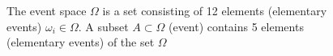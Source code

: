 \begin{figure}
\centering



\caption{The event space $\Omega$ is a set consisting of 12 elements (elementary events) 
$\omega_i \in \Omega$. A subset $A \subset \Omega$ (event) contains 5 elements (elementary events) of the set $\Omega$}
\label{figAddProbabilityDefinition}
\end{figure}